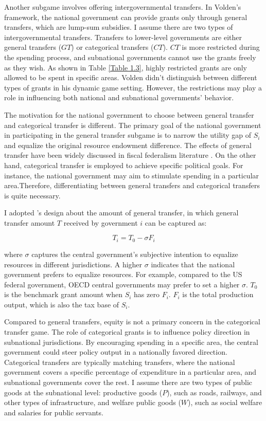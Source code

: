 Another subgame involves offering intergovernmental transfers. In Volden's framework, the national government can provide grants only through general transfers, which are lump-sum subsidies. I assume there are two types of intergovernmental transfers. Transfers to lower-level governments are either general transfers ($GT$)\label{transfer} or categorical transfers ($CT$). $CT$ is more restricted during the spending process, and subnational governments cannot use the grants freely as they wish. As shown in Table \ref{Table 1.3}, highly restricted grants are only allowed to be spent in specific areas. Volden didn't distinguish between different types of grants in his dynamic game setting. However, the restrictions may play a role in influencing both national and subnational governments' behavior.


The motivation for the national government to choose between general transfer and categorical transfer is different. The primary goal of the national government in participating in the general transfer subgame is to narrow the utility gap of $S_i$ and equalize the original resource endowment difference. The effects of general transfer have been widely discussed in fiscal federalism literature \parencite{buettner2006incentive,lv2018transfer}. On the other hand, categorical transfer is employed to achieve specific political goals. For instance, the national government may aim to stimulate spending in a particular area.Therefore, differentiating between general transfers and categorical transfers is quite necessary.

I adopted \Textcite{buettner2006incentive}'s design about the amount of general transfer, in which general transfer amount $T$ received by government $i$ can be captured as:

\begin{equation}
    T_i = T_0 - \sigma F_i\label{generaltransfer}
\end{equation}


where $\sigma$ captures the central government's subjective intention to equalize resources in different jurisdictions. A higher $\sigma$ indicates that the national government prefers to equalize resources. For example, compared to the US federal government, OECD central governments may prefer to set a higher $\sigma$. $T_0$ is the benchmark grant amount when $S_i$ has zero $F_i$. $F_i$ is the total production output, which is also the tax base of $S_i$.


Compared to general transfers, equity is not a primary concern in the categorical transfer game. The role of categorical grants is to influence policy direction in subnational jurisdictions. By encouraging spending in a specific area, the central government could steer policy output in a nationally favored direction. Categorical transfers are typically matching transfers, where the national government covers a specific percentage of expenditure in a particular area, and subnational governments cover the rest. I assume there are two types of public goods at the subnational level: productive goods ($P$), such as roads, railways, and other types of infrastructure, and welfare public goods ($W$), such as social welfare and salaries for public servants.%


